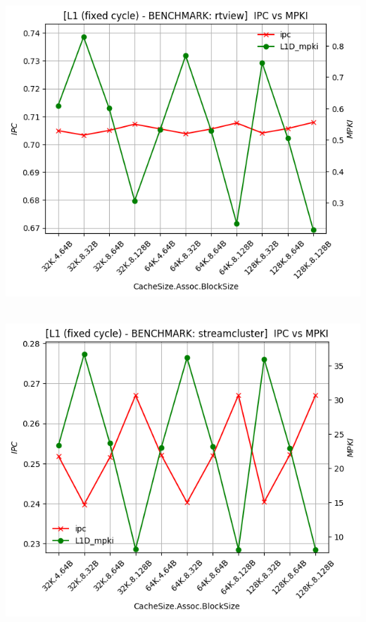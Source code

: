 \begin{minipage}{\textwidth}
    \begin{center}
        \\
        \vspace{3mm}
        \includegraphics[scale=0.70]{graphs/L1/fixed/rtview.png}
        \vspace{6mm}
    \end{center}
\end{minipage}

\begin{minipage}{\textwidth}
    \begin{center}
        \\
        \vspace{3mm}
        \includegraphics[scale=0.70]{graphs/L1/fixed/streamcluster.png}
        \vspace{6mm}
    \end{center}
\end{minipage}


